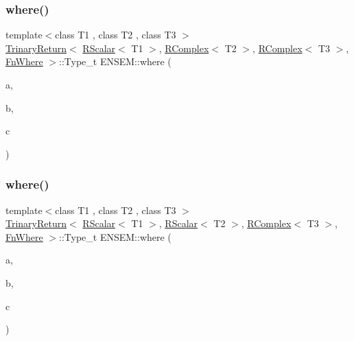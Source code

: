 \subsubsection{\texorpdfstring{where()}{where()}\hspace{0.1cm}{\footnotesize\ttfamily [2/3]}}
{\footnotesize\ttfamily template$<$class T1 , class T2 , class T3 $>$ \\
\mbox{\hyperlink{structENSEM_1_1TrinaryReturn}{Trinary\+Return}}$<$ \mbox{\hyperlink{classENSEM_1_1RScalar}{R\+Scalar}}$<$ T1 $>$, \mbox{\hyperlink{classENSEM_1_1RComplex}{R\+Complex}}$<$ T2 $>$, \mbox{\hyperlink{classENSEM_1_1RComplex}{R\+Complex}}$<$ T3 $>$, \mbox{\hyperlink{structENSEM_1_1FnWhere}{Fn\+Where}} $>$\+::Type\+\_\+t E\+N\+S\+E\+M\+::where (\begin{DoxyParamCaption}\item[{const \mbox{\hyperlink{classENSEM_1_1RScalar}{R\+Scalar}}$<$ T1 $>$ \&}]{a,  }\item[{const \mbox{\hyperlink{classENSEM_1_1RComplex}{R\+Complex}}$<$ T2 $>$ \&}]{b,  }\item[{const \mbox{\hyperlink{classENSEM_1_1RScalar}{R\+Scalar}}$<$ T3 $>$ \&}]{c }\end{DoxyParamCaption})\hspace{0.3cm}{\ttfamily [inline]}}

\mbox{\label{group__rcomplex_ga69c3ed4f12ac9e2b1fcba29be62f0622}} 
\subsubsection{\texorpdfstring{where()}{where()}\hspace{0.1cm}{\footnotesize\ttfamily [3/3]}}
{\footnotesize\ttfamily template$<$class T1 , class T2 , class T3 $>$ \\
\mbox{\hyperlink{structENSEM_1_1TrinaryReturn}{Trinary\+Return}}$<$ \mbox{\hyperlink{classENSEM_1_1RScalar}{R\+Scalar}}$<$ T1 $>$, \mbox{\hyperlink{classENSEM_1_1RScalar}{R\+Scalar}}$<$ T2 $>$, \mbox{\hyperlink{classENSEM_1_1RComplex}{R\+Complex}}$<$ T3 $>$, \mbox{\hyperlink{structENSEM_1_1FnWhere}{Fn\+Where}} $>$\+::Type\+\_\+t E\+N\+S\+E\+M\+::where (\begin{DoxyParamCaption}\item[{const \mbox{\hyperlink{classENSEM_1_1RScalar}{R\+Scalar}}$<$ T1 $>$ \&}]{a,  }\item[{const \mbox{\hyperlink{classENSEM_1_1RScalar}{R\+Scalar}}$<$ T2 $>$ \&}]{b,  }\item[{const \mbox{\hyperlink{classENSEM_1_1RComplex}{R\+Complex}}$<$ T3 $>$ \&}]{c }\end{DoxyParamCaption})\hspace{0.3cm}{\ttfamily [inline]}}

